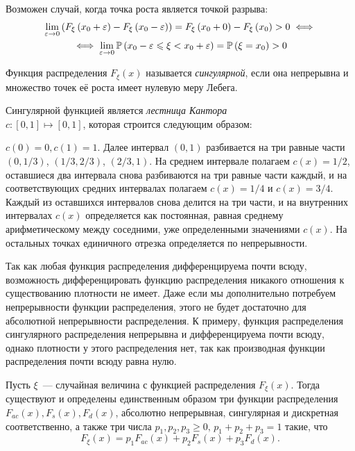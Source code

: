\begin{rmrk}
    Возможен случай, когда точка роста является точкой разрыва:
    \begin{multline*}
    \lim _{\varepsilon \to 0} \left( F_{\xi}\left(x_{0}+\varepsilon\right) - F_{\xi}\left(x_{0}-\varepsilon\right) \right)=F_{\xi}\left(x_{0}+0\right)-F_{\xi}\left(x_{0}\right)>0 \iff \\
    \iff \lim\limits_{\varepsilon \to 0}\operatorname{\mathbb{P}}\left(x_{0}-\varepsilon \leqslant \xi<x_{0}+\varepsilon\right)=\operatorname{\mathbb{P}}\left(\xi=x_{0}\right)>0
    \end{multline*}
\end{rmrk}

\begin{defn}
    Функция распределения $F_\xi(x)$ называется \textit{сингулярной}, если она непрерывна и множество точек её роста имеет нулевую меру Лебега.
\end{defn}
\begin{exmp}
    Сингулярной функцией является \textit{лестница Кантора} \\ $c \colon [0, 1] \mapsto [0, 1]$, которая строится следующим образом:
    
    $c(0) = 0, c(1) = 1$. 
    Далее интервал $(0, 1)$ разбивается на три равные части $(0, 1/3)$, $(1/3, 2/3)$, $(2/3, 1)$. 
    На среднем интервале полагаем $c(x) = 1/2$, оставшиеся два интервала снова разбиваются на три равные части каждый, и на соответствующих средних интервалах полагаем $c(x) = 1/4$ и $c(x) = 3/4$. 
    Каждый из оставшихся интервалов снова делится на три части, и на внутренних интервалах $c(x)$ определяется как постоянная, равная среднему арифметическому между соседними, уже определенными значениями $c(x)$. 
    На остальных точках единичного отрезка определяется по непрерывности. 
\end{exmp}

\begin{rmrk}
    Так как любая функция распределения дифференцируема почти всюду, возможность дифференцировать функцию распределения никакого отношения к существованию плотности не имеет. 
    Даже если мы дополнительно потребуем непрерывности функции распределения, этого не будет достаточно для абсолютной непрерывности распределения. 
    К примеру, функция распределения сингулярного распределения непрерывна и дифференцируема почти всюду, однако плотности у этого распределения нет, так как производная функции распределения почти всюду равна нулю.
\end{rmrk}

\begin{namedthm}
    Пусть $\xi$~--- случайная величина с функцией распределения $F_\xi(x).$ 
    Тогда существуют и определены единственным образом три функции распределения $F_{ac}(x), F_s(x), F_d(x)$, 
    абсолютно непрерывная, сингулярная и дискретная соответственно, а также три числа $p_1, p_2, p_3 \geqslant 0,\, p_1 + p_2 + p_3 = 1$ такие, что 
    \begin{equation*}
        F_{\xi}(x)=p_{1} F_{ac}(x)+p_{2} F_{s}(x)+p_{3} F_{d}(x).
    \end{equation*}
\end{namedthm}
